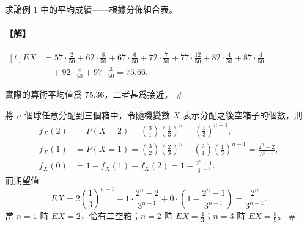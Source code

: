\medskip
\begin{example}\label{ex:b5s-5-11}
求論例 1 中的平均成績——根據分佈組合表。
\end{example}
\paragraph{【解】}
$\begin{aligned}[t]
EX &= 57 \cdot \frac{2}{50} + 62 \cdot \frac{8}{50} + 67 \cdot \frac{6}{50} + 72 \cdot \frac{7}{50} + 77 \cdot \frac{12}{50} + 82 \cdot \frac{4}{50} + 87 \cdot \frac{4}{50} \\
&\quad + 92 \cdot \frac{4}{50} + 97 \cdot \frac{3}{50} = 75.66.
\end{aligned}$

實際的算術平均值爲 75.36，二者甚爲接近。 \hfill \#

\medskip
\begin{example}\label{ex:b5s-5-12}
將 $n$ 個球任意分配到三個箱中，令隨機變數 $X$ 表示分配之後空箱子的個數，則
\begin{align*}
f_X(2) &= P(X=2) = \binom{3}{1}\left(\frac{1}{3}\right)^n = \left(\frac{1}{3}\right)^{n-1}, \\
f_X(1) &= P(X=1) = \binom{3}{2}\left(\frac{2}{3}\right)^n - \binom{2}{1}\left(\frac{1}{3}\right)^{n-1} = \frac{2^n - 2}{3^{n-1}}, \\
f_X(0) &= 1 - f_X(1) - f_X(2) = 1 - \frac{2^n - 1}{3^{n-1}}.
\end{align*}
而期望值
\[
EX = 2 \left(\frac{1}{3}\right)^{n-1} + 1 \cdot \frac{2^n - 2}{3^{n-1}} + 0 \cdot \left(1 - \frac{2^n - 1}{3^{n-1}}\right) = \frac{2^n}{3^{n-1}}.
\]
當 $n=1$ 時 $EX=2$，恰有二空箱；$n=2$ 時 $EX=\frac{4}{3}$；$n=3$ 時 $EX=\frac{8}{9}$。 \hfill \#
\end{example}

